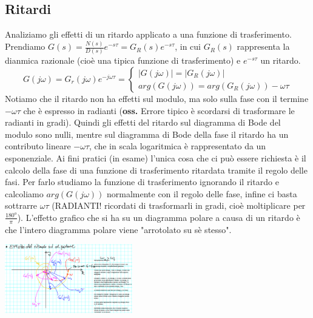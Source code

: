 \begin{landscape}
\begin{multicols*}{3}
    \section{Ritardi}
    Analiziamo gli effetti di un ritardo applicato a una funzione di trasferimento. Prendiamo $G(s) = \frac{N(s)}{D(s)} e^{-s \tau} = G_R(s) e^{-s \tau}$, in cui $G_R(s)$ rappresenta la dianmica razionale (cioè una tipica funzione di trasferimento) e $e^{-s \tau}$ un ritardo.
        \[
            G(j \omega) = G_r(j \omega) e^{- j \omega \tau} = \begin{cases}
                |G(j \omega)| = |G_R(j \omega)|\\
                arg(G(j \omega)) = arg(G_R(j \omega)) - \omega \tau
            \end{cases}
        \]
        Notiamo che il ritardo non ha effetti sul modulo, ma solo sulla fase con il termine $- \omega \tau$ che è espresso in radianti (\textbf{oss.} Errore tipico è scordarsi di trasformare le radianti in gradi).\newline
        Quindi gli effetti del ritardo sul diagramma di Bode del modulo sono nulli, mentre sul diagramma di Bode della fase il ritardo ha un contributo lineare $- \omega \tau$, che in scala logaritmica è rappresentato da un esponenziale.\newline
        \newline
        Ai fini pratici (in esame) l'unica cosa che ci può essere richiesta è il calcolo della fase di una funzione di trasferimento ritardata tramite il regolo delle fasi. Per farlo studiamo la funzione di trasferimento ignorando il ritardo e calcoliamo $arg(G(j \omega))$ normalmente con il regolo delle fase, infine ci basta sottrarre $\omega \tau$ (RADIANTI! ricordati di trasformarli in gradi, cioè moltiplicare per $\frac{180^o}{\pi}$). \newline
        \newline
        L'effetto grafico che si ha su un diagramma polare a causa di un ritardo è che l'intero diagramma polare viene "arrotolato su sè stesso".
        \begin{center}
            \includegraphics[height=3cm]{../lezione17/img2.PNG}

\end{center}
\end{multicols*}
\end{landscape}
